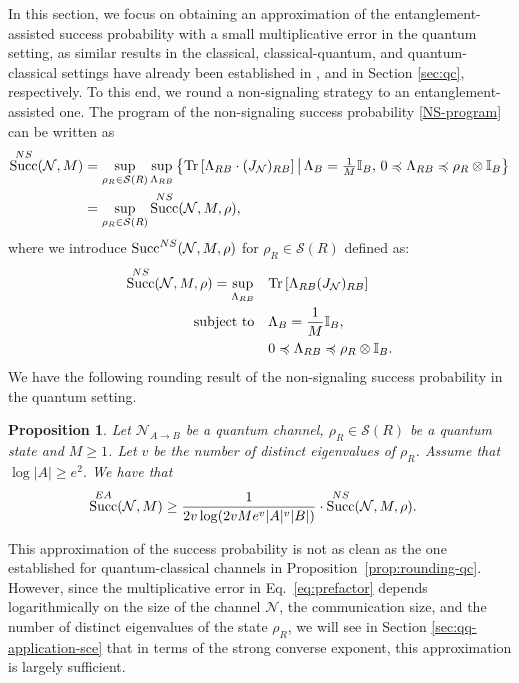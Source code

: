 \documentclass[a4paper,onecolumn,11pt,accepted=2025-10-01]{quantumarticle}
\newtheorem{prop}[theorem]{Proposition}
\DeclareMathOperator{\suc}{Succ}
\newcommand*{\cN}{\mathcal{N}}
\newcommand*{\cS}{\mathcal{S}}
\newcommand*{\tr}[1]{\mathrm{Tr}\left[#1\right]}
\newcommand*{\mle}{\preccurlyeq}
\begin{document}
In this section, we focus  on obtaining an approximation of the entanglement-assisted success probability with a small multiplicative error in the quantum setting, as similar results in  the classical, classical-quantum,  and quantum-classical settings have already been established in \cite{barman2017algorithmic,Fawzi19}, and in Section \ref{sec:qc},  respectively. To this end, we round a non-signaling strategy to an entanglement-assisted one. The program of the non-signaling success probability \eqref{NS-program} can be written as 
\begin{align}
           \suc^{\rm{NS}}(\cN,M)
           &=\sup_{\rho_{R} \in \cS(R)} \sup_{\Lambda_{RB}} \left\{\tr{\Lambda_{RB} \cdot (J_{\cN})_{RB}}\,\middle|\,\Lambda_B = \tfrac{1}{M}\mathbb{I}_B,\, 0\mle  \Lambda_{RB} \mle \rho_R \otimes  \mathbb{I}_B\right\} \\
           &= \sup_{\rho_{R} \in \cS(R)} \suc^{\rm{NS}}(\cN,M, \rho),
\end{align}
where we introduce $\suc^{\rm{NS}}(\cN,M, \rho) $ for $\rho_{R} \in \cS(R)$ defined as:
\begin{align}\label{eq:ns-program-rho}
     \suc^{\rm{NS}}(\cN,M,  \rho) = \sup_{ \Lambda_{RB}} \quad & \tr{\Lambda_{RB} (J_{\cN})_{RB}} \notag \\
\text{subject to} \quad
& \Lambda_B = \frac{1}{M} \mathbb{I}_B, \notag \\
& 0 \mle \Lambda_{RB} \mle \rho_R \otimes \mathbb{I}_B. 
\end{align}
We have the following rounding result of the non-signaling success probability in the quantum setting.

\begin{prop}\label{prop:qq-rounding}
Let $\cN_{A\rightarrow B}$ be a quantum channel,   $\rho_R \in \cS(R)$ be a quantum state and $M\ge 1$. 
Let $v$ be the number of distinct eigenvalues of $\rho_R$. Assume that $\log|A|\ge e^2$. 
    We have that
    \begin{align}\label{eq:prefactor}
         \suc^{\rm{EA}}(\cN,M) &\ge \frac{1}{2v \log(2v M e^{v}|A|^{v}|B|)}\cdot \suc^{\rm{NS}}(\cN, M,  \rho) .
    \end{align}
\end{prop}

This approximation of the success probability is not as clean as the one established for quantum-classical channels in Proposition~\ref{prop:rounding-qc}. However, since the multiplicative error in Eq.~\eqref{eq:prefactor} depends logarithmically on the size of the channel $\cN$, the communication size, and the number of distinct eigenvalues of the state $\rho_R$, we will see in Section \ref{sec:qq-application-sce} that in terms of the strong converse exponent, this approximation is largely sufficient.\\
\end{document}
